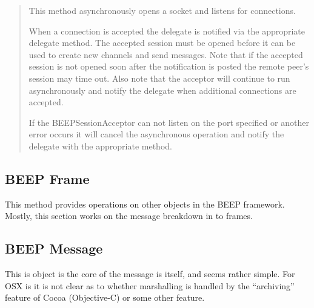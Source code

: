 \begin {quote}
This method asynchronously opens a socket and listens for connections.

 When a connection is accepted the delegate is notified via the appropriate delegate method.  The accepted session must be opened before it can be used to create new channels and send messages.  Note that if the accepted session is not opened soon after the notification is posted the remote peer's session may time out. Also note that the acceptor will continue to run asynchronously and notify the delegate when additional connections are accepted.
 
 If the BEEPSessionAcceptor can not listen on the port specified or another error occurs it will cancel
 the asynchronous operation and notify the delegate with the appropriate method.
\end{quote}\cite {OSXgridAPI}


\subsection {BEEP Frame}
This method provides operations on other objects in the BEEP framework.  Mostly, this section works on the message breakdown in to frames.    %
    
    
\subsection {BEEP Message}
 This is object is the core of the message is itself, and seems rather simple.  For OSX is it is not clear as to whether marshalling is handled by the ``archiving'' feature of Cocoa (Objective-C) or some other feature.  
 
 
    